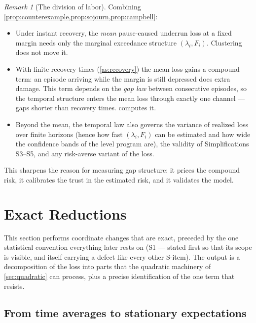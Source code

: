 \documentclass[11pt, a4paper]{article}
\theoremstyle{definition}
\theoremstyle{plain}
\theoremstyle{remark}
\newtheorem{remark}{Remark}[section]
\begin{document}
\begin{remark}[The division of labor]\label{rem:division}
Combining \cref{prop:counterexample,prop:sojourn,prop:campbell}:
\begin{itemize}
  \item Under instant recovery, the \emph{mean} pause-caused underrun
    loss at a fixed margin needs only the marginal exceedance structure
    $(\lambda_i, F_i)$.  Clustering does not move it.
  \item With finite recovery times (\cref{as:recovery}) the mean loss
    gains a compound term: an episode arriving while the margin is still
    depressed does extra damage.  This term depends on the \emph{gap
    law} between consecutive episodes, so the temporal structure enters
    the mean loss through exactly one channel --- gaps shorter than
    recovery times.   computes it.
  \item Beyond the mean, the temporal law also governs the variance of
    realized loss over finite horizons (hence how fast
    $(\lambda_i, F_i)$ can be estimated and how wide the confidence
    bands of the level program are), the validity of Simplifications
    S3--S5, and any risk-averse variant of the loss.
\end{itemize}
This sharpens the reason for measuring gap structure: it prices the
compound risk, it calibrates the trust in the estimated risk, and it
validates the model.
\end{remark}

\section{Exact Reductions}\label{sec:reductions}

This section performs coordinate changes that are exact, preceded by
the one statistical convention everything later rests on (S1 ---
stated first so that its scope is visible, and itself carrying a
defect like every other S-item).  The output is a decomposition of the loss into parts that
the quadratic machinery of \cref{sec:quadratic} can process, plus a
precise identification of the one term that resists.

\subsection{From time averages to stationary expectations}
\label{sec:ergodic}
\end{document}
